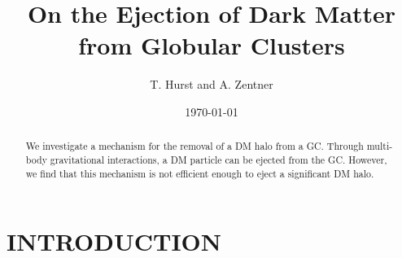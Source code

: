 \documentclass[aps,floatfix,prd,showpacs]{revtex4}
\begin{document}
\title{On the Ejection of Dark Matter from Globular Clusters}
\author{T. Hurst and A. Zentner}

\date{\today}

\begin{abstract}
We investigate a mechanism for the removal of a DM halo from a GC.  Through multi-body gravitational interactions, a DM particle can be ejected from the GC.  However, we find that this mechanism is not efficient enough to eject a significant DM halo.
\end{abstract}
\maketitle

\section{INTRODUCTION}
\label{section:intro3}



\end{document}
